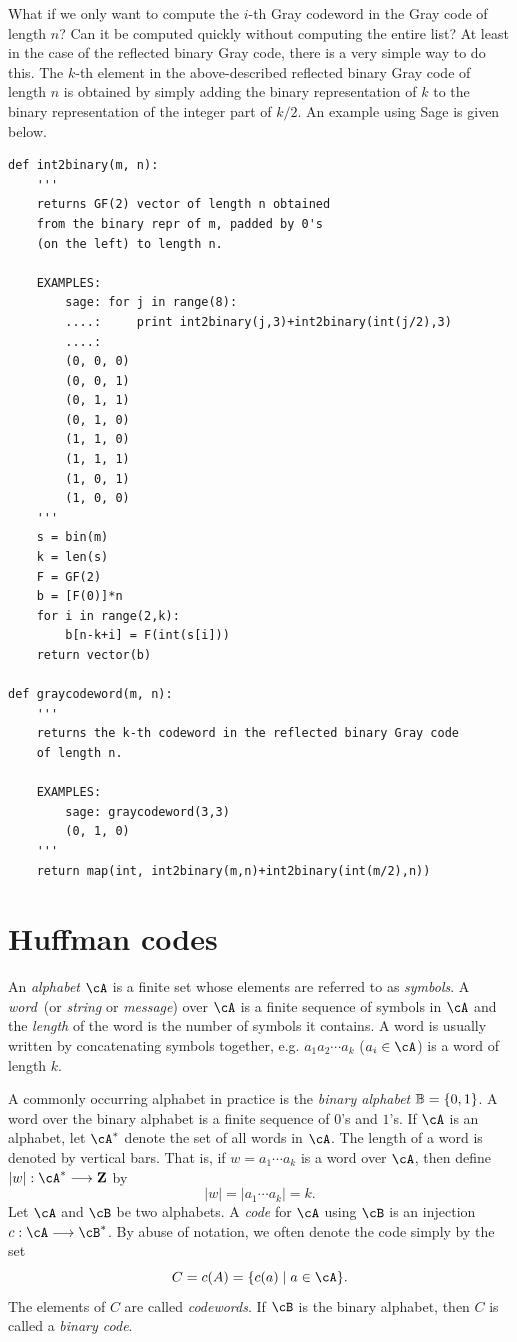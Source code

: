 What if we only want to compute the $i$-th Gray codeword in the Gray
code of length $n$? Can it be computed quickly without computing the
entire list? At least in the case of the reflected binary Gray code,
there is a very simple way to do this. The $k$-th element in the
above-described reflected binary Gray code of length $n$ is obtained
by simply adding the binary representation of $k$ to the binary
representation of the integer part of $k / 2$. An example using Sage
is given below.

\begin{lstlisting}
def int2binary(m, n):
    '''
    returns GF(2) vector of length n obtained
    from the binary repr of m, padded by 0's
    (on the left) to length n.

    EXAMPLES:
        sage: for j in range(8):
        ....:     print int2binary(j,3)+int2binary(int(j/2),3)
        ....:
        (0, 0, 0)
        (0, 0, 1)
        (0, 1, 1)
        (0, 1, 0)
        (1, 1, 0)
        (1, 1, 1)
        (1, 0, 1)
        (1, 0, 0)
    '''
    s = bin(m)
    k = len(s)
    F = GF(2)
    b = [F(0)]*n
    for i in range(2,k):
        b[n-k+i] = F(int(s[i]))
    return vector(b)

def graycodeword(m, n):
    '''
    returns the k-th codeword in the reflected binary Gray code
    of length n.

    EXAMPLES:
        sage: graycodeword(3,3)
        (0, 1, 0)
    '''
    return map(int, int2binary(m,n)+int2binary(int(m/2),n))
\end{lstlisting}



\section{Huffman codes}
\label{sec:trees_forests:Huffman_codes}

An \emph{alphabet} $\cA$ is a finite set whose
elements are referred to as \emph{symbols}. A
\emph{word}~(or \emph{string} or
\emph{message}) over $\cA$ is a finite sequence of
symbols in $\cA$ and the \emph{length} of the word is the number of
symbols it contains. A word is usually written by concatenating
symbols together, e.g. $a_1 a_2 \cdots a_k$ ($a_i \in \cA$) is a word
of length $k$.

A commonly occurring alphabet in practice is the
\emph{binary alphabet} $\mathbb{B} = \{0, 1\}$. A word
over the binary alphabet is a finite sequence of $0$'s and
$1$'s. If $\cA$ is an alphabet, let $\cA^*$ denote the set of all
words in $\cA$. The length of a word is denoted by vertical bars. That
is, if $w = a_1 \cdots a_k$ is a word over $\cA$, then define
$|w|: \cA^* \to \Z$ by
\[
|w|
=
|a_1 \cdots a_k|
=
k.
\]
Let $\cA$ and $\cB$ be two alphabets. A \emph{code} for
$\cA$ using $\cB$ is an injection $c: \cA \to \cB^*$. By abuse of
notation, we often denote the code simply by the set
\[
C
=
c(A)
=
\{c(a) \mid a \in \cA\}.
\]
The elements of $C$ are called \emph{codewords}. If
$\cB$ is the binary alphabet, then $C$ is called a
\emph{binary code}.


